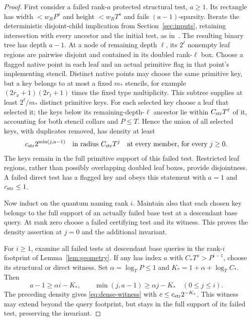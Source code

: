 \begin{proof}
First consider a failed rank-$a$ protected structural test, $a\ge1$. Its rectangle has width $<w_RP^a$ and height $<w_RT^a$ and fails $(a-1)$-sparsity. Iterate the deterministic disjoint-child implication from Section~\ref{sec:inputs}, retaining intersection with every ancestor and the initial test, as in~\cite[Lemma~12.1]{DMMemory2026}. The resulting binary tree has depth $a-1$. At a node of remaining depth $\ell$, its $2^\ell$ nonempty leaf regions are pairwise disjoint and contained in its doubled rank-$\ell$ box. Choose a flagged native point in each leaf and an actual primitive flag in that point's implementing stencil. Distinct native points may choose the same primitive key, but a key belongs to at most a fixed $m_*$ stencils, for example $(2r_x+1)(2r_t+1)$ times the fixed type multiplicity. This subtree supplies at least $2^\ell/m_*$ distinct primitive keys. For each selected key choose a leaf that selected it; the keys below its remaining-depth-$\ell$ ancestor lie within $C_{\rm str}T^\ell$ of it, accounting for both stencil collars and $P\le T$. Hence the union of all selected keys, with duplicates removed, has density at least
\[
 c_{\rm str}2^{\min(j,a-1)}\quad\hbox{in radius }C_{\rm str}T^j
 \quad\hbox{at every member, for every }j\ge0.
\]
The keys remain in the full primitive support of this failed test. Restricted leaf regions, rather than possibly overlapping doubled leaf boxes, provide disjointness. A failed direct test has a flagged key and obeys this statement with $a=1$ and $c_{\rm str}\le1$.

Now induct on the quantum naming rank $i$. Maintain also that each chosen key belongs to the full support of an actually failed base test at a descendant base query. At rank zero choose a failed certifying test and its witness. This proves the density assertion at $j=0$ and the additional invariant.

For $i\ge1$, examine all failed tests at descendant base queries in the rank-$i$ footprint of Lemma~\ref{lem:geometry}. If any has index $a$ with $C_*T^a>P^{i-1}$, choose its structural or direct witness. Set $\alpha=\log_TP\le1$ and $K_*=1+\alpha+\log_TC_*$. Then
\[
 a-1\ge\alpha i-K_*,\qquad
 \min(j,a-1)\ge\alpha j-K_*\quad(0\le j\le i).
\]
The preceding density gives \eqref{eq:dense-witness} with $c\le c_{\rm str}2^{-K_*}$. This witness may extend beyond the query footprint, but stays in the full support of its failed test, preserving the invariant.


\end{proof}
